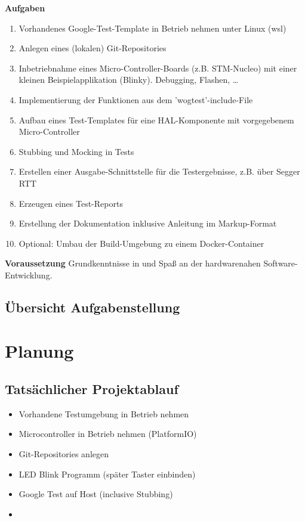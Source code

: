 \documentclass[12pt,a4paper]{article}
\begin{document}
\textbf{Aufgaben}
\begin{enumerate}
  \item Vorhandenes Google-Test-Template in Betrieb nehmen unter Linux (wsl)
  \item Anlegen eines (lokalen) Git-Repositories
  \item Inbetriebnahme eines Micro-Controller-Boards (z.B. STM-Nucleo) mit einer kleinen Beispielapplikation (Blinky). Debugging, Flashen, …
  \item Implementierung der Funktionen aus dem 'wogtest'-include-File
  \item Aufbau eines Test-Templates für eine HAL-Komponente mit vorgegebenem Micro-Controller
  \item Stubbing und Mocking in Tests
  \item Erstellen einer Ausgabe-Schnittstelle für die Testergebnisse, z.B. über Segger RTT
  \item Erzeugen eines Test-Reports
  \item Erstellung der Dokumentation inklusive Anleitung im Markup-Format
  \item Optional: Umbau der Build-Umgebung zu einem Docker-Container\newline
\end{enumerate}
\textbf{Voraussetzung}
\newline
Grundkenntnisse in und Spaß an der hardwarenahen Software-Entwicklung.

\subsection{Übersicht Aufgabenstellung}

\empty

\newpage
\section{Planung}
\subsection{Tatsächlicher Projektablauf}
\begin{itemize}
  \item Vorhandene Testumgebung in Betrieb nehmen
  \item Microcontroller in Betrieb nehmen (PlatformIO)
  \item Git-Repositories anlegen
  \item LED Blink Programm (später Taster einbinden)
  \item Google Test auf Host (inclusive Stubbing)
  \item 

\end{itemize}
\end{document}
